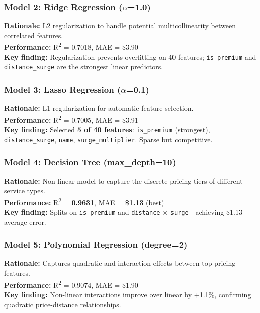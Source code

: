 \documentclass[12pt,a4paper]{article}
\begin{document}
\subsubsection*{Model 2: Ridge Regression ($\alpha$=1.0)}
\textbf{Rationale:} L2 regularization to handle potential multicollinearity between correlated features.\\
\textbf{Performance:} R\textsuperscript{2} = 0.7018, MAE = \$3.90\\
\textbf{Key finding:} Regularization prevents overfitting on 40 features; \texttt{is\_premium} and \texttt{distance\_surge} are the strongest linear predictors.

\subsubsection*{Model 3: Lasso Regression ($\alpha$=0.1)}
\textbf{Rationale:} L1 regularization for automatic feature selection.\\
\textbf{Performance:} R\textsuperscript{2} = 0.7005, MAE = \$3.91\\
\textbf{Key finding:} Selected \textbf{5 of 40 features}: \texttt{is\_premium} (strongest), \texttt{distance\_surge}, \texttt{name}, \texttt{surge\_multiplier}. Sparse but competitive.

\subsubsection*{Model 4: Decision Tree (max\_depth=10)}
\textbf{Rationale:} Non-linear model to capture the discrete pricing tiers of different service types.\\
\textbf{Performance:} R\textsuperscript{2} = \textbf{0.9631}, MAE = \textbf{\$1.13} (best)\\
\textbf{Key finding:} Splits on \texttt{is\_premium} and \texttt{distance} $\times$ \texttt{surge}---achieving \$1.13 average error.

\subsubsection*{Model 5: Polynomial Regression (degree=2)}
\textbf{Rationale:} Captures quadratic and interaction effects between top pricing features.\\
\textbf{Performance:} R\textsuperscript{2} = 0.9074, MAE = \$1.90\\
\textbf{Key finding:} Non-linear interactions improve over linear by +1.1\%, confirming quadratic price-distance relationships.
\end{document}
